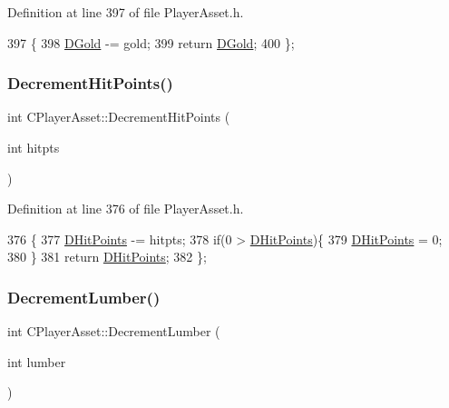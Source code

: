 Definition at line 397 of file Player\+Asset.\+h.


\begin{DoxyCode}
397                                    \{
398             \hyperlink{classCPlayerAsset_ab90ebdc73c6794fd44ddbe273f610292}{DGold} -= gold;
399             \textcolor{keywordflow}{return} \hyperlink{classCPlayerAsset_ab90ebdc73c6794fd44ddbe273f610292}{DGold};
400         \};
\end{DoxyCode}
\hypertarget{classCPlayerAsset_a34aa2679bb9d5d2d46774b8e7210fe53}{}\label{classCPlayerAsset_a34aa2679bb9d5d2d46774b8e7210fe53} 
\subsubsection{\texorpdfstring{Decrement\+Hit\+Points()}{DecrementHitPoints()}}
{\footnotesize\ttfamily int C\+Player\+Asset\+::\+Decrement\+Hit\+Points (\begin{DoxyParamCaption}\item[{int}]{hitpts }\end{DoxyParamCaption})\hspace{0.3cm}{\ttfamily [inline]}}



Definition at line 376 of file Player\+Asset.\+h.


\begin{DoxyCode}
376                                           \{
377             \hyperlink{classCPlayerAsset_a331750935bf594e665544085fb74e89d}{DHitPoints} -= hitpts;
378             \textcolor{keywordflow}{if}(0 > \hyperlink{classCPlayerAsset_a331750935bf594e665544085fb74e89d}{DHitPoints})\{
379                 \hyperlink{classCPlayerAsset_a331750935bf594e665544085fb74e89d}{DHitPoints} = 0;   
380             \}
381             \textcolor{keywordflow}{return} \hyperlink{classCPlayerAsset_a331750935bf594e665544085fb74e89d}{DHitPoints};
382         \};
\end{DoxyCode}
\hypertarget{classCPlayerAsset_a95f968ddfe0ec332764a730bced03834}{}\label{classCPlayerAsset_a95f968ddfe0ec332764a730bced03834} 
\subsubsection{\texorpdfstring{Decrement\+Lumber()}{DecrementLumber()}}
{\footnotesize\ttfamily int C\+Player\+Asset\+::\+Decrement\+Lumber (\begin{DoxyParamCaption}\item[{int}]{lumber }\end{DoxyParamCaption})\hspace{0.3cm}{\ttfamily [inline]}}



